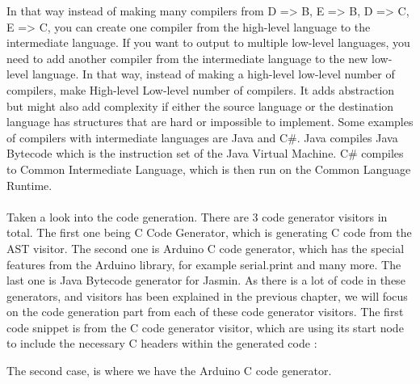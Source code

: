 In that way instead of making many compilers from D => B, E => B, D => C, E => C, you can create one compiler from the high-level language to the intermediate language. If you want to output to multiple low-level languages, you need to add another compiler from the intermediate language to the new low-level language. In that way, instead of making a high-level \* low-level number of compilers, make High-level \+ Low-level number of compilers. It adds abstraction but might also add complexity if either the source language or the destination language has structures that are hard or impossible to implement. Some examples of compilers with intermediate languages are Java and C\#. Java compiles Java Bytecode which is the instruction set of the Java Virtual Machine. C\# compiles to Common Intermediate Language, which is then run on the Common Language Runtime.\\
\\
Taken a look into the code generation. There are 3 code generator visitors in total. The first one being C Code Generator, which is generating C code from the AST visitor. The second one is Arduino C code generator, which has the special features from the Arduino library, for example serial.print and many more. The last one is Java Bytecode generator for Jasmin. As there is a lot of code in these generators, and visitors has been explained in the previous chapter, we will focus on the code generation part from each of these code generator visitors.
The first code snippet is from the C code generator visitor, which are using its start node to include the necessary C headers within the generated code : \\
\begin{figure}[H]
\centering
{}
\label{io01}
\end{figure}
The second case, is where we have the Arduino C code generator.
